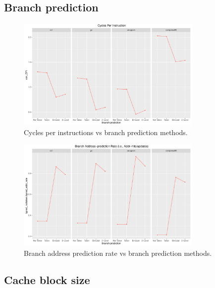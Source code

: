 \documentclass[10pt]{scrartcl}
\begin{document}
\FloatBarrier

\subsection{Branch prediction}

\begin{figure}[h]
  \centering
  \includegraphics[width=0.8\textwidth]{Plots/plot_BP_sim_CPI}
  \caption{Cycles per instructions vs branch prediction methods.}\label{fig:bp_sim_cpi}
\end{figure}

\begin{figure}[h]
  \centering
  \includegraphics[width=0.8\textwidth]{Plots/plot_BP_bpred_addr_rate}
  \caption{Branch address prediction rate vs branch prediction methods.}\label{fig:bp_addr-pred-rate}
\end{figure}

\FloatBarrier

\subsection{Cache block size}
\end{document}
